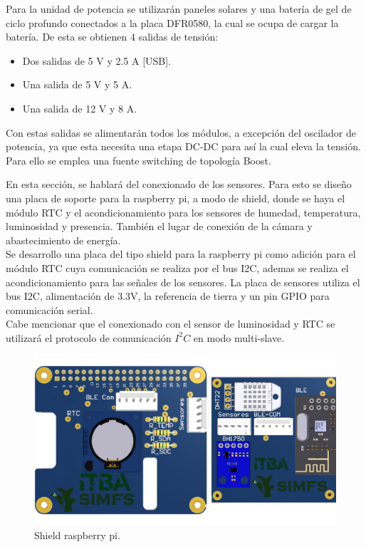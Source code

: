 
Para la unidad de potencia se utilizarán paneles solares y una batería de gel de ciclo profundo conectados a la placa DFR0580, la cual se ocupa de cargar la batería. De esta se obtienen 4 salidas de tensión:
\begin{itemize}
	\item Dos salidas de 5 V y 2.5 A [USB].
	\item Una salida de 5 V y 5 A.
	\item Una salida de 12 V y 8 A.
\end{itemize}

Con estas salidas se alimentarán todos los módulos, a excepción del oscilador de potencia, ya que esta necesita una etapa DC-DC para así la cual eleva la tensión. Para ello se emplea una fuente switching de topología Boost.


En esta sección, se hablará del conexionado de los sensores.
Para esto se diseño una placa de soporte para la raspberry pi, a modo de shield, donde se haya el módulo RTC y el acondicionamiento para los sensores de humedad, temperatura, luminosidad y presencia. También el lugar de conexión de la cámara y abastecimiento de energía.\\
Se desarrollo una placa del tipo shield para la raspberry pi como adición para el módulo RTC cuya comunicación se realiza por el bus I2C, ademas se realiza el acondicionamiento para las señales de los sensores. La placa de sensores utiliza el bus I2C, alimentación de 3.3V, la referencia de tierra y un pin GPIO para comunicación serial.\\
Cabe mencionar que el conexionado con el sensor de luminosidad y RTC se utilizará el protocolo de comunicación $I^2C$ en modo multi-slave.

\begin{figure}[H]
	\centering
	\includegraphics[width=0.9\linewidth,page=1]{ImagenesIngenieria de Detalle/RPI}		
	\caption{Shield raspberry pi.}
	\label{fig:conexionado_Rpi}
\end{figure}

